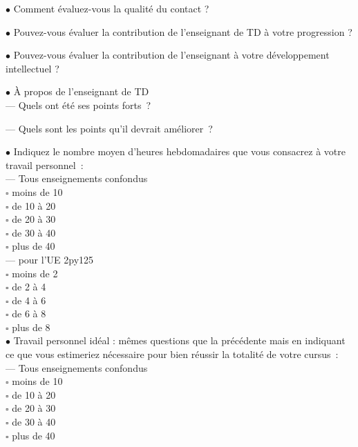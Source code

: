 \documentclass[10pt]{letter}
\begin{document}
$\bullet$ Comment évaluez-vous la qualité du contact ? \\
\vspace{1.0cm}


$\bullet$ Pouvez-vous évaluer la contribution de l'enseignant de TD à votre progression ? \\
\vspace{1.0cm}


$\bullet$ Pouvez-vous évaluer la contribution de l’enseignant à votre développement intellectuel ? \\
\vspace{1.0cm}


$\bullet$ À propos de l’enseignant de TD \\
--- Quels ont été ses points forts ? \\
\vspace{1.0cm}

--- Quels sont les points qu’il devrait améliorer ? \\
\vspace{1.0cm}


$\bullet$ Indiquez le nombre moyen d’heures hebdomadaires que vous consacrez à votre travail personnel : \\
--- Tous enseignements confondus \\
$\square$ moins de 10 \\
$\square$ de 10 à 20 \\
$\square$ de 20 à 30 \\
$\square$ de 30 à 40 \\
$\square$ plus de 40 \\

--- pour l'UE 2py125 \\
$\square$ moins de 2 \\
$\square$ de 2 à 4 \\
$\square$ de 4 à 6 \\
$\square$ de 6 à 8 \\
$\square$ plus de 8 \\


\newpage
$\bullet$ Travail personnel idéal : mêmes questions que la précédente mais en indiquant ce que vous estimeriez nécessaire pour bien réussir la totalité de votre cursus : \\
--- Tous enseignements confondus \\
$\square$ moins de 10 \\
$\square$ de 10 à 20 \\
$\square$ de 20 à 30 \\
$\square$ de 30 à 40 \\
$\square$ plus de 40 \\
\end{document}
